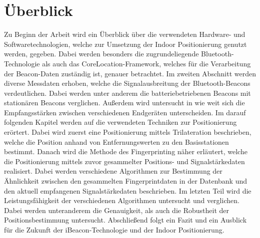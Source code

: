 \section{Überblick}
\label{sec:introduction:overview}
Zu Beginn der Arbeit wird ein Überblick über die verwendeten Hardware- und Softwaretechnologien, welche zur Umsetzung der Indoor Positionierung genutzt werden, gegeben. Dabei werden besonders die zugrundeliegende Bluetooth-Technologie als auch das CoreLocation-Framework, welches für die Verarbeitung der Beacon-Daten zuständig ist, genauer betrachtet. Im zweiten Abschnitt werden diverse Messdaten erhoben, welche die Signalausbreitung der Bluetooth-Beacons verdeutlichen. Dabei werden unter anderem die batteriebetriebenen Beacons mit stationären Beacons verglichen. Außerdem wird untersucht in wie weit sich die Empfangsstärken zwischen verschiedenen Endgeräten unterscheiden. 
Im darauf folgenden Kapitel werden auf die verwendeten Techniken zur Positionierung erörtert. Dabei wird zuerst eine Positionierung mittels Trilateration beschrieben, welche die Position anhand von Entfernungswerten zu den Basisstationen bestimmt. Danach wird die Methode des Fingerprinting näher erläutert, welche die Positionierung mittels zuvor gesammelter Positions- und Signalstärkedaten realisiert. Dabei werden verschiedene Algorithmen zur Bestimmung der Ähnlichkeit zwischen den gesammelten Fingerprintdaten in der Datenbank und den aktuell empfangenen Signalstärkedaten beschrieben.
Im letzten Teil wird die Leistungsfähigkeit der verschiedenen Algorithmen untersucht und verglichen. Dabei werden unteranderem die Genauigkeit, als auch die Robustheit der Positionsbestimmung untersucht.
Abschließend folgt ein Fazit und ein Ausblick für die Zukunft der iBeacon-Technologie und der Indoor Positionierung.
